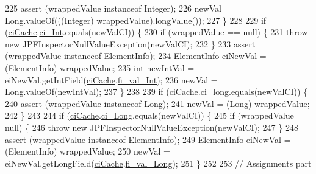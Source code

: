\begin{DoxyCode}
225         assert (wrappedValue instanceof Integer);
226         newVal = Long.valueOf(((Integer) wrappedValue).longValue());
227       \}
228 
229       \textcolor{keywordflow}{if} (\hyperlink{classgov_1_1nasa_1_1jpf_1_1inspector_1_1server_1_1programstate_1_1_state_value_a38182b5018580765f3f2cdc9e96e1ca2}{ciCache}.\hyperlink{classgov_1_1nasa_1_1jpf_1_1inspector_1_1utils_1_1_class_info_cache_a3b473de6d927038466bee13b61c7cb47}{ci\_Int}.equals(newValCI)) \{
230         \textcolor{keywordflow}{if} (wrappedValue == null) \{
231           \textcolor{keywordflow}{throw} \textcolor{keyword}{new} JPFInspectorNullValueException(newValCI);
232         \}
233         assert (wrappedValue instanceof ElementInfo);
234         ElementInfo eiNewVal = (ElementInfo) wrappedValue;
235         \textcolor{keywordtype}{int} newIntVal = eiNewVal.getIntField(\hyperlink{classgov_1_1nasa_1_1jpf_1_1inspector_1_1server_1_1programstate_1_1_state_value_a38182b5018580765f3f2cdc9e96e1ca2}{ciCache}.\hyperlink{classgov_1_1nasa_1_1jpf_1_1inspector_1_1utils_1_1_class_info_cache_ae4ee1bec68b7401ac340b710a0571b7c}{fi\_val\_Int});
236         newVal = Long.valueOf(newIntVal);
237       \}
238 
239       \textcolor{keywordflow}{if} (\hyperlink{classgov_1_1nasa_1_1jpf_1_1inspector_1_1server_1_1programstate_1_1_state_value_a38182b5018580765f3f2cdc9e96e1ca2}{ciCache}.\hyperlink{classgov_1_1nasa_1_1jpf_1_1inspector_1_1utils_1_1_class_info_cache_a443fc5040ae83e418b516f65c9353a1a}{ci\_long}.equals(newValCI)) \{
240         assert (wrappedValue instanceof Long);
241         newVal = (Long) wrappedValue;
242       \}
243 
244       \textcolor{keywordflow}{if} (\hyperlink{classgov_1_1nasa_1_1jpf_1_1inspector_1_1server_1_1programstate_1_1_state_value_a38182b5018580765f3f2cdc9e96e1ca2}{ciCache}.\hyperlink{classgov_1_1nasa_1_1jpf_1_1inspector_1_1utils_1_1_class_info_cache_a6d7daa36979cf1cc7c46059d9307c9dc}{ci\_Long}.equals(newValCI)) \{
245         \textcolor{keywordflow}{if} (wrappedValue == null) \{
246           \textcolor{keywordflow}{throw} \textcolor{keyword}{new} JPFInspectorNullValueException(newValCI);
247         \}
248         assert (wrappedValue instanceof ElementInfo);
249         ElementInfo eiNewVal = (ElementInfo) wrappedValue;
250         newVal = eiNewVal.getLongField(\hyperlink{classgov_1_1nasa_1_1jpf_1_1inspector_1_1server_1_1programstate_1_1_state_value_a38182b5018580765f3f2cdc9e96e1ca2}{ciCache}.\hyperlink{classgov_1_1nasa_1_1jpf_1_1inspector_1_1utils_1_1_class_info_cache_a61641d1953034f6e52340a98b1d7f93b}{fi\_val\_Long});
251       \}
252 
253       \textcolor{comment}{// Assignments part}

\end{DoxyCode}
